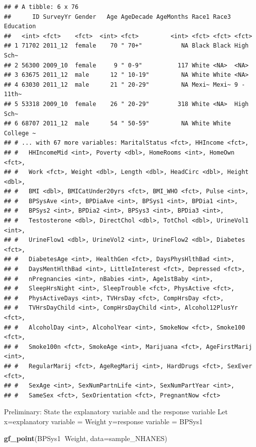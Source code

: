 \documentclass[]{book}
\newenvironment{Shaded}{\begin{snugshade}}{\end{snugshade}}
\newcommand{\DataTypeTok}[1]{\textcolor[rgb]{0.13,0.29,0.53}{#1}}
\newcommand{\KeywordTok}[1]{\textcolor[rgb]{0.13,0.29,0.53}{\textbf{#1}}}
\newcommand{\NormalTok}[1]{#1}
\newcommand{\OperatorTok}[1]{\textcolor[rgb]{0.81,0.36,0.00}{\textbf{#1}}}
\begin{document}
\begin{verbatim}
## # A tibble: 6 x 76
##      ID SurveyYr Gender   Age AgeDecade AgeMonths Race1 Race3 Education
##   <int> <fct>    <fct>  <int> <fct>         <int> <fct> <fct> <fct>    
## 1 71702 2011_12  female    70 " 70+"           NA Black Black High Sch~
## 2 56300 2009_10  female     9 " 0-9"          117 White <NA>  <NA>     
## 3 63675 2011_12  male      12 " 10-19"         NA White White <NA>     
## 4 63030 2011_12  male      21 " 20-29"         NA Mexi~ Mexi~ 9 - 11th~
## 5 53318 2009_10  female    26 " 20-29"        318 White <NA>  High Sch~
## 6 68707 2011_12  male      54 " 50-59"         NA White White College ~
## # ... with 67 more variables: MaritalStatus <fct>, HHIncome <fct>,
## #   HHIncomeMid <int>, Poverty <dbl>, HomeRooms <int>, HomeOwn <fct>,
## #   Work <fct>, Weight <dbl>, Length <dbl>, HeadCirc <dbl>, Height <dbl>,
## #   BMI <dbl>, BMICatUnder20yrs <fct>, BMI_WHO <fct>, Pulse <int>,
## #   BPSysAve <int>, BPDiaAve <int>, BPSys1 <int>, BPDia1 <int>,
## #   BPSys2 <int>, BPDia2 <int>, BPSys3 <int>, BPDia3 <int>,
## #   Testosterone <dbl>, DirectChol <dbl>, TotChol <dbl>, UrineVol1 <int>,
## #   UrineFlow1 <dbl>, UrineVol2 <int>, UrineFlow2 <dbl>, Diabetes <fct>,
## #   DiabetesAge <int>, HealthGen <fct>, DaysPhysHlthBad <int>,
## #   DaysMentHlthBad <int>, LittleInterest <fct>, Depressed <fct>,
## #   nPregnancies <int>, nBabies <int>, Age1stBaby <int>,
## #   SleepHrsNight <int>, SleepTrouble <fct>, PhysActive <fct>,
## #   PhysActiveDays <int>, TVHrsDay <fct>, CompHrsDay <fct>,
## #   TVHrsDayChild <int>, CompHrsDayChild <int>, Alcohol12PlusYr <fct>,
## #   AlcoholDay <int>, AlcoholYear <int>, SmokeNow <fct>, Smoke100 <fct>,
## #   Smoke100n <fct>, SmokeAge <int>, Marijuana <fct>, AgeFirstMarij <int>,
## #   RegularMarij <fct>, AgeRegMarij <int>, HardDrugs <fct>, SexEver <fct>,
## #   SexAge <int>, SexNumPartnLife <int>, SexNumPartYear <int>,
## #   SameSex <fct>, SexOrientation <fct>, PregnantNow <fct>
\end{verbatim}

Preliminary: State the explanatory variable and the response variable
Let x=explanatory variable = Weight
y=response variable = BPSys1



\begin{Shaded}
\begin{Highlighting}[]
\KeywordTok{gf_point}\NormalTok{(BPSys1}\OperatorTok{~}\NormalTok{Weight, }\DataTypeTok{data=}\NormalTok{sample_NHANES)}
\end{Highlighting}
\end{Shaded}
\end{document}
